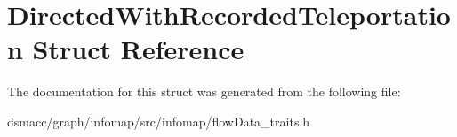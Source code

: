 \hypertarget{structDirectedWithRecordedTeleportation}{}\section{Directed\+With\+Recorded\+Teleportation Struct Reference}
\label{structDirectedWithRecordedTeleportation}


The documentation for this struct was generated from the following file\+:\begin{DoxyCompactItemize}
\item 
dsmacc/graph/infomap/src/infomap/flow\+Data\+\_\+traits.\+h\end{DoxyCompactItemize}
